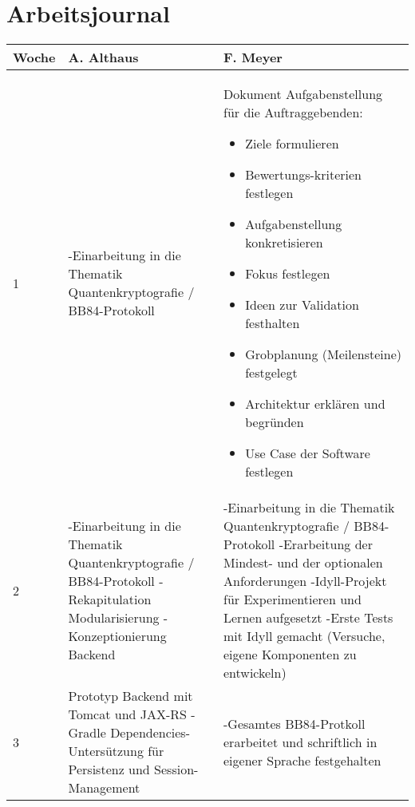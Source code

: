 \section{Arbeitsjournal}
\begin{longtable}{p{1cm}p{6cm}p{6cm}}
Woche & A. Althaus & F. Meyer \\
\hline
1 &  -Einarbeitung in die Thematik Quantenkryptografie / BB84-Protokoll & Dokument Aufgabenstellung für die Auftraggebenden: 
\begin{itemize} 
\item Ziele formulieren \vspace{-3mm}
\item Bewertungs-kriterien festlegen \vspace{-3mm}
\item Aufgabenstellung konkretisieren \vspace{-3mm}
\item Fokus festlegen \vspace{-3mm}
\item Ideen zur Validation festhalten \vspace{-3mm}
\item Grobplanung (Meilensteine) festgelegt \vspace{-3mm}
\item Architektur erklären und begründen \vspace{-3mm}
\item Use Case der Software festlegen 
\end{itemize} \\
2  & -Einarbeitung in die Thematik Quantenkryptografie / BB84-Protokoll \newline -Rekapitulation Modularisierung \newline -Konzeptionierung Backend &  -Einarbeitung in die Thematik Quantenkryptografie / BB84-Protokoll \newline -Erarbeitung der Mindest- und der optionalen Anforderungen \newline  -Idyll-Projekt für Experimentieren und Lernen aufgesetzt \newline  -Erste Tests mit Idyll gemacht (Versuche, eigene Komponenten zu entwickeln)
 \\ 
3  & Prototyp Backend mit Tomcat und JAX-RS \newline -Gradle \newline Dependencies-Untersützung für Persistenz und Session-Management & -Gesamtes BB84-Protkoll erarbeitet und schriftlich in eigener Sprache festgehalten \newline

\end{longtable}
